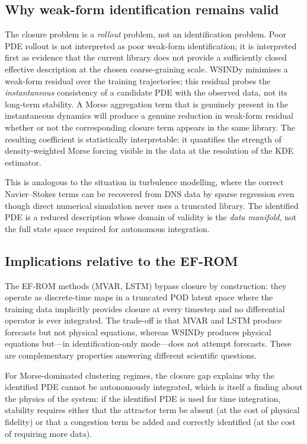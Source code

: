 \subsection{Why weak-form identification remains valid}

The closure problem is a \emph{rollout} problem, not an identification
problem.  Poor PDE rollout is not interpreted as poor weak-form
identification; it is interpreted first as evidence that the current
library does not provide a sufficiently closed effective description at the
chosen coarse-graining scale.  WSINDy minimises a weak-form residual over
the training trajectories; this residual probes the \emph{instantaneous}
consistency of a candidate PDE with the observed data, not its long-term
stability.  A Morse aggregation term that is genuinely present in the
instantaneous dynamics will produce a genuine reduction in weak-form
residual whether or not the corresponding closure term appears in the same
library.  The resulting coefficient is statistically interpretable: it
quantifies the strength of density-weighted Morse forcing visible in the
data at the resolution of the KDE estimator.

This is analogous to the situation in turbulence modelling, where the
correct Navier--Stokes terms can be recovered from DNS data by sparse
regression even though direct numerical simulation never uses a truncated
library.  The identified PDE is a reduced description whose domain of
validity is the \emph{data manifold}, not the full state space required
for autonomous integration.

\subsection{Implications relative to the EF-ROM}

The EF-ROM methods (MVAR, LSTM) bypass closure by construction: they
operate as discrete-time maps in a truncated POD latent space where the
training data implicitly provides closure at every timestep and no
differential operator is ever integrated.  The trade-off is that MVAR and
LSTM produce forecasts but not physical equations, whereas WSINDy produces
physical equations but---in identification-only mode---does not attempt
forecasts.  These are complementary properties answering different
scientific questions.

For Morse-dominated clustering regimes, the closure gap explains why the
identified PDE cannot be autonomously integrated, which is itself a finding
about the physics of the system: if the identified PDE is used for time
integration, stability requires either that the attractor term be absent
(at the cost of physical fidelity) or that a congestion term be added and
correctly identified (at the cost of requiring more data).

